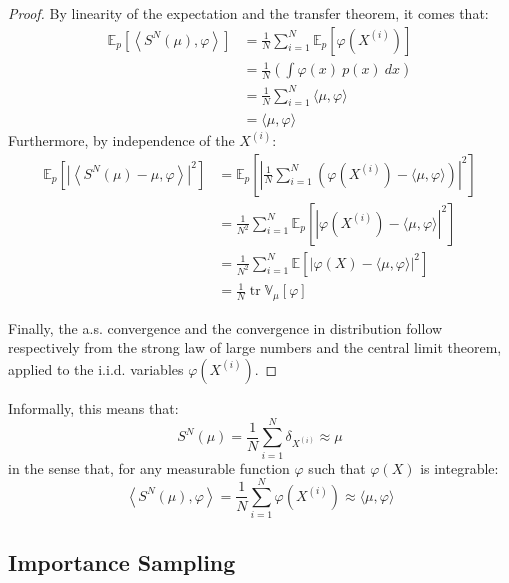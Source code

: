 \begin{proof}
	By linearity of the expectation and the transfer theorem, it comes that:
	\begin{equation}
		\begin{aligned}
		\mathbb{E}_p\left[\left\langle S^N(\mu),\varphi\right\rangle\right]&=\frac{1}N\sum_{i=1}^N\mathbb{E}_p\left[\varphi\left(X^{(i)}\right)\right]\\
		&=\frac{1}{N}\left(\int{\varphi(x)\:p(x)\:dx}\right)\\
		&=\frac{1}N\sum_{i=1}^N\langle\mu,\varphi\rangle\\
		&=\langle\mu,\varphi\rangle
		\end{aligned}
	\end{equation}
	Furthermore, by independence of the $X^{(i)}$:
	\begin{equation}
		\begin{aligned}
		\mathbb{E}_p\left[\left|\left\langle S^N(\mu)-\mu,\varphi\right\rangle\right|^2\right]&=\mathbb{E}_p\left[\left|\frac{1}N\sum_{i=1}^N\left(\varphi\left(X^{(i)}\right)-\langle\mu,\varphi\rangle\right)\right|^2\right]\\
		&=\frac{1}{N^2}\sum_{i=1}^N\mathbb{E}_p\left[\left|\varphi\left(X^{(i)}\right)-\langle\mu,\varphi\rangle\right|^2\right]\\
		&=\frac{1}{N^2}\sum_{i=1}^N\mathbb{E}\left[|\varphi(X)-\langle\mu,\varphi\rangle|^2\right]\\
		&=\frac{1}{N}\operatorname{tr}\mathbb{V}_\mu[\varphi]
		\end{aligned}
	\end{equation}

	Finally, the a.s. convergence and the convergence in distribution follow respectively from the strong law of large numbers and the central limit theorem, applied to the i.i.d. variables $\varphi\left(X^{(i)}\right)$.
\end{proof}

Informally, this means that:
\begin{equation}
	S^N(\mu)=\frac{1}{N}\sum_{i=1}^N\delta_{X^{(i)}}\approx\mu
\end{equation}
in the sense that, for any measurable function $\varphi$ such that $\varphi(X)$ is integrable:
\begin{equation}
	\left\langle S^N(\mu),\varphi\right\rangle=\frac{1}{N}\sum_{i=1}^N\varphi\left(X^{(i)}\right)\approx\langle\mu,\varphi\rangle
\end{equation}

\subsection{Importance Sampling}

